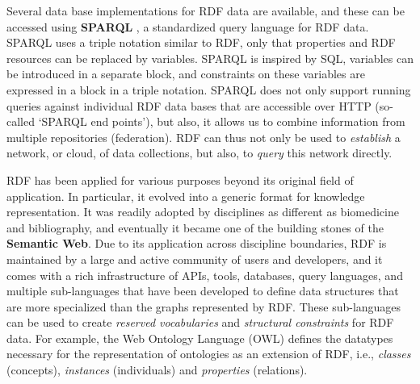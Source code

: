 Several data base implementations for RDF data are available, and these can be accessed using \textbf{SPARQL} \citep{prud2008sparql}, a standardized query language for RDF data.
SPARQL uses a triple notation similar to RDF, only that properties and RDF resources can be replaced by variables. SPARQL is inspired by SQL, variables can be introduced in a separate  block, and constraints on these variables are expressed in a  block in a triple notation. SPARQL does not only support running queries against individual RDF data bases that are accessible over HTTP (so-called `SPARQL end points'), but also, it allows us to combine information from multiple repositories (federation). RDF can thus not only be used to \emph{establish} a network, or cloud, of data collections, but also, to \emph{query} this network directly.

RDF has been applied for various purposes beyond its original field of application. In particular, it evolved into a generic format for knowledge representation. It was readily adopted by disciplines as different as biomedicine and bibliography, and eventually it became one of the building stones of the \textbf{Semantic Web}. Due to its application across discipline boundaries, RDF is maintained by a large and active community of users and developers, and it comes with a rich infrastructure of APIs, tools, databases, query languages, and multiple sub-languages that have been developed to define data structures that are more specialized than the graphs represented by RDF. These sub-languages can be used to create \emph{reserved vocabularies} and \emph{structural constraints} for RDF data. For example, the Web Ontology Language (OWL) defines the datatypes necessary for the representation of ontologies as an extension of RDF, i.e., \emph{classes} (concepts), \emph{instances} (individuals) and \emph{properties} (relations). 

